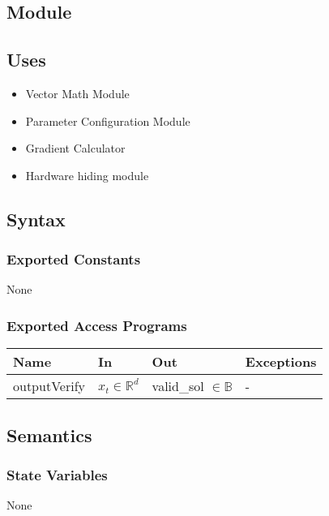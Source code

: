 \documentclass[12pt, titlepage]{article}
\begin{document}
\subsection{Module}



\subsection{Uses}
\begin{itemize}
    \item Vector Math Module
    \item Parameter Configuration Module
    \item Gradient Calculator
\end{itemize}
\begin{itemize}
    \item Hardware hiding module
\end{itemize}

\subsection{Syntax}

\subsubsection{Exported Constants}
None
\subsubsection{Exported Access Programs}

\begin{center}
\begin{tabular}{p{2cm} p{4cm} p{4cm} p{2cm}}
\hline
\textbf{Name} & \textbf{In} & \textbf{Out} & \textbf{Exceptions} \\
\hline
outputVerify & $x_{t} \in \mathbb{R}^d$ & valid\_sol $\in \mathbb{B}$  & - \\
\hline
\end{tabular}
\end{center}

\subsection{Semantics}
\subsubsection{State Variables}
None
\end{document}

